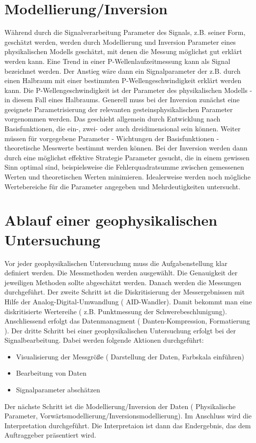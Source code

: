 \section{Modellierung/Inversion}
Während durch die Signalverarbeitung Parameter des Signals, z.B. seiner Form, geschätzt werden, werden durch Modellierung und Inversion Parameter eines physikalischen Modells geschätzt, mit denen die Messung möglichst gut erklärt werden kann. Eine Trend in einer P-Wellenlaufzeitmessung kann als Signal bezeichnet werden. Der Anstieg wäre dann ein Signalparameter der z.B. durch einen Halbraum mit einer bestimmten P-Wellengeschwindigkeit erklärt werden kann. Die P-Wellengeschwindigkeit ist der Parameter des physikalischen Modells - in diesem Fall eines Halbraums. Generell muss bei der Inversion zunächst eine geeignete Parametrisierung der relevanten gesteinsphysikalischen Parameter vorgenommen werden. Das geschieht allgemein durch Entwicklung nach Basisfunktionen, die ein-, zwei- oder auch dreidimensional sein können.  Weiter müssen für vorgegebene Parameter - Wichtungen der Basisfunktionen - theoretische Messwerte bestimmt werden können. Bei der Inversion werden dann durch eine möglichst effektive Strategie Parameter gesucht, die in einem gewissen Sinn optimal sind, beispielsweise die Fehlerquadratsumme zwischen gemessenen Werten und theoretischen Werten minimieren. Idealerweise werden noch mögliche Wertebereiche für die Parameter angegeben und Mehrdeutigkeiten untersucht.  

\section{Ablauf einer geophysikalischen Untersuchung}
Vor jeder geophysikalischen Untersuchung muss die Aufgabenstellung klar definiert werden. Die Messmethoden werden ausgewählt. Die Genauigkeit der jeweiligen Methoden sollte abgeschätzt werden. Danach werden die Messungen durchgeführt.
 Der zweite Schritt ist die Diskritisierung der Messergebnissen mit Hilfe der Analog-Digital-Umwandlung ( AID-Wandler). Damit bekommt man eine diskritisierte Wertereihe ( z.B. Punktmessung der Schwerebeschlunigung). Anschliessend erfolgt das Datenmanagment ( Danten-Kompression, Formatierung ).
 Der dritte Schritt bei einer geophysikalischen Untersuchung erfolgt bei der Signalbearbeitung.  Dabei werden folgende Aktionen durchgeführt: 
 \begin{itemize}
\item Visualisierung der Messgröße ( Darstellung der Daten, Farbskala einführen)
\item Bearbeitung von Daten
\item Signalparameter abschätzen

  \end{itemize}
 Der nächste Schritt ist die Modellierung/Inversion der Daten ( Physikalische Parameter, Vorwärtsmodellierung/Inversionsmodellierung).
 Im Anschluss wird die Interpretation durchgeführt. Die Interpretaion ist dann das Endergebnis,  das dem Auftraggeber präsentiert wird. 


